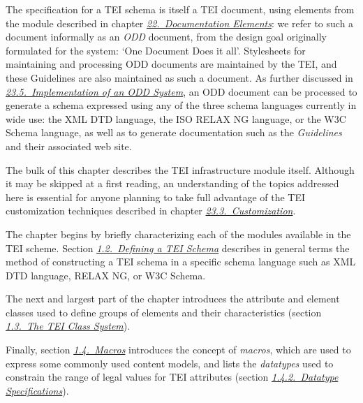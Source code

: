 The specification for a TEI schema is itself a TEI document, using elements from the module described in chapter \textit{\hyperref[TD]{22.\ Documentation Elements}}: we refer to such a document informally as an \textit{ODD} document, from the design goal originally formulated for the system: ‘One Document Does it all’. Stylesheets for maintaining and processing ODD documents are maintained by the TEI, and these Guidelines are also maintained as such a document. As further discussed in \textit{\hyperref[IM]{23.5.\ Implementation of an ODD System}}, an ODD document can be processed to generate a schema expressed using any of the three schema languages currently in wide use: the XML DTD language, the ISO RELAX NG language, or the W3C Schema language, as well as to generate documentation such as the \textit{Guidelines} and their associated web site.\par
The bulk of this chapter describes the TEI infrastructure module itself. Although it may be skipped at a first reading, an understanding of the topics addressed here is essential for anyone planning to take full advantage of the TEI customization techniques described in chapter \textit{\hyperref[MD]{23.3.\ Customization}}.\par
The chapter begins by briefly characterizing each of the modules available in the TEI scheme. Section \textit{\hyperref[STIN]{1.2.\ Defining a TEI Schema}} describes in general terms the method of constructing a TEI schema in a specific schema language such as XML DTD language, RELAX NG, or W3C Schema.\par
The next and largest part of the chapter introduces the attribute and element classes used to define groups of elements and their characteristics (section \textit{\hyperref[STEC]{1.3.\ The TEI Class System}}).\par
Finally, section \textit{\hyperref[STmacros]{1.4.\ Macros}} introduces the concept of \textit{macros}, which are used to express some commonly used content models, and lists the \textit{datatypes} used to constrain the range of legal values for TEI attributes (section \textit{\hyperref[DTYPES]{1.4.2.\ Datatype Specifications}}).
